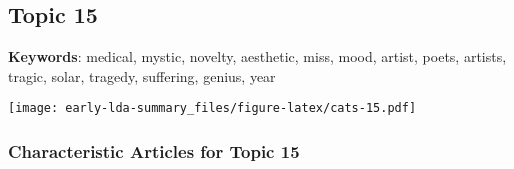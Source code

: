 \documentclass[
]{article}
\begin{document}
\newpage

\hypertarget{topic-15}{%
\subsection{Topic 15}\label{topic-15}}

\textbf{Keywords}: medical, mystic, novelty, aesthetic, miss, mood,
artist, poets, artists, tragic, solar, tragedy, suffering, genius, year

\texttt{[image: early-lda-summary\_files/figure-latex/cats-15.pdf]}
\newpage 

\hypertarget{characteristic-articles-for-topic-15}{%
\subsubsection{Characteristic Articles for Topic
15}\label{characteristic-articles-for-topic-15}}
\end{document}
